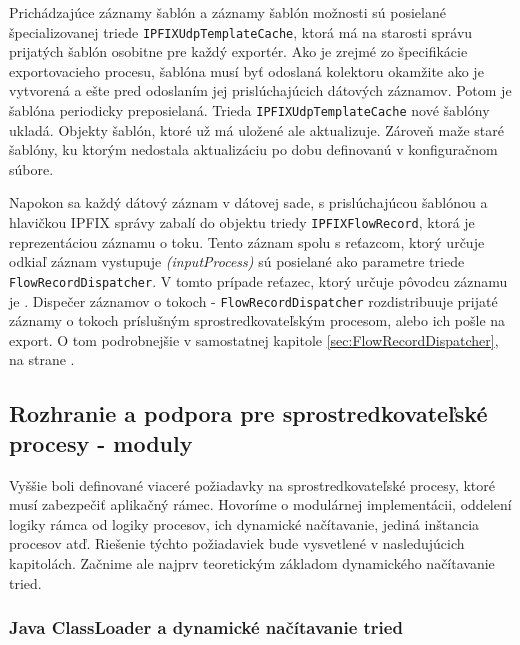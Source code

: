 Prichádzajúce záznamy šablón a záznamy šablón možnosti sú posielané špecializovanej triede 
\verb|IPFIXUdpTemplateCache|, ktorá má na starosti správu prijatých šablón osobitne pre každý exportér. 
Ako je zrejmé zo špecifikácie exportovacieho procesu, šablóna musí byť odoslaná kolektoru okamžite ako je 
vytvorená a ešte pred odoslaním jej prislúchajúcich dátových záznamov. Potom je šablóna periodicky 
preposielaná. Trieda \verb|IPFIXUdpTemplateCache| nové šablóny ukladá. Objekty šablón, ktoré už má 
uložené ale aktualizuje. Zároveň maže staré šablóny, ku ktorým nedostala aktualizáciu po dobu definovanú v 
konfiguračnom súbore.

Napokon sa každý dátový záznam v dátovej sade, s prislúchajúcou šablónou a hlavičkou IPFIX správy 
zabalí do objektu triedy \verb|IPFIXFlowRecord|, ktorá je reprezentáciou záznamu o toku. 
Tento záznam spolu s reťazcom, ktorý určuje odkiaľ záznam vystupuje \emph{(inputProcess)} sú posielané
ako parametre triede \verb|FlowRecordDispatcher|. V tomto prípade reťazec, ktorý určuje pôvodcu záznamu 
je \emph{}. 
Dispečer záznamov o tokoch - \verb|FlowRecordDispatcher| rozdistribuuje prijaté záznamy o tokoch 
príslušným sprostredkovateľským procesom, alebo ich pošle na export. O tom podrobnejšie v samostatnej 
kapitole \ref{sec:FlowRecordDispatcher}, na strane \pageref{sec:FlowRecordDispatcher}. 


\subsection{Rozhranie a podpora pre sprostredkovateľské procesy - moduly} \label{sec:intermediate_process}

Vyššie boli definované viaceré požiadavky na sprostredkovateľské procesy, ktoré musí zabezpečiť 
aplikačný rámec. Hovoríme o modulárnej implementácii, oddelení logiky rámca od logiky procesov, 
ich dynamické načítavanie, jediná inštancia procesov atď. Riešenie týchto požiadaviek bude vysvetlené v 
nasledujúcich kapitolách. Začnime ale najprv teoretickým základom dynamického načítavanie tried.

\subsubsection{Java ClassLoader a dynamické načítavanie tried} \label{sec:classLoader}

